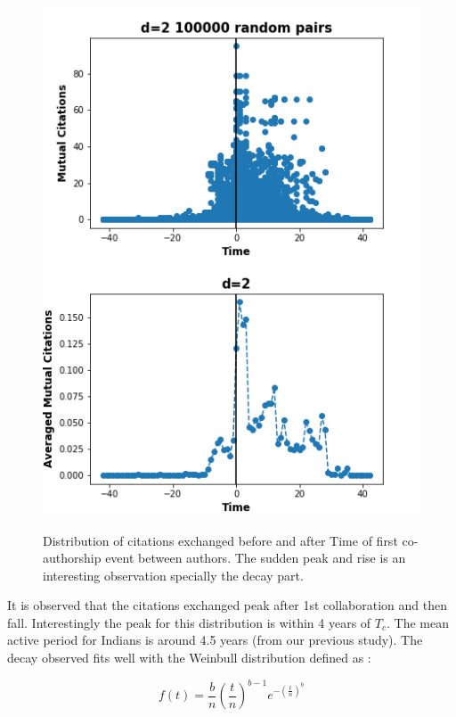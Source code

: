 \documentclass[aps, pre, twocolumn, nofootinbib]{revtex4-1}
\begin{document}
\begin{figure}[htbp]  
	\centering
	
	\includegraphics[scale = 0.49]{plots/d2}
	\includegraphics[scale = 0.49]{plots/d2_avg}
	
	\captionsetup{singlelinecheck=false, justification=raggedright,  labelsep=space}
	\caption{Distribution of citations exchanged before and after Time of first co-authorship event between authors. The sudden peak and rise is an interesting observation specially the decay part.}
	\label{f6}
\end{figure}

It is observed that the citations exchanged peak after 1st collaboration and then fall. Interestingly the peak for this distribution is within 4 years of $T_c$. The mean active period for Indians is around 4.5 years (from our previous study). The decay observed fits well with the Weinbull distribution defined as :

\begin{equation}
 f(t) = \frac{b}{n}(\frac{t}{n})^{b-1} e^{-(\frac{t}{n})^b}
\end{equation}
\end{document}
